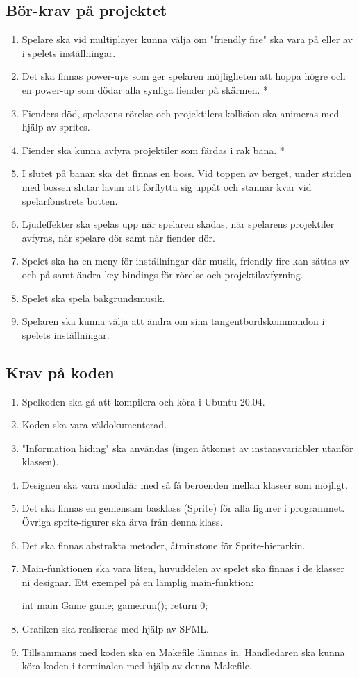 \documentclass{TDP005mall}
\begin{document}
\subsection{Bör-krav på projektet}
\begin{enumerate}
\item Spelare ska vid multiplayer kunna välja om "friendly fire" ska vara på eller av i spelets inställningar. 
\item Det ska finnas power-ups som ger spelaren möjligheten att hoppa högre och en power-up som dödar alla synliga fiender på skärmen. *
\item Fienders död, spelarens rörelse och projektilers kollision ska animeras med hjälp av sprites.
\item Fiender ska kunna avfyra projektiler som färdas i rak bana. *
\item I slutet på banan ska det finnas en boss. Vid toppen av berget, under striden med bossen slutar lavan att förflytta sig uppåt och stannar kvar vid spelarfönstrets botten.
\item Ljudeffekter ska spelas upp när spelaren skadas, när spelarens projektiler avfyras, när spelare dör samt när fiender dör.
\item Spelet ska ha en meny för inställningar där musik, friendly-fire kan sättas av och på samt ändra key-bindings för rörelse och projektilavfyrning.
\item Spelet ska spela bakgrundsmusik.
\item Spelaren ska kunna välja att ändra om sina tangentbordskommandon i spelets inställningar.
\end{enumerate}

\subsection{Krav på koden}
\begin{enumerate}
\item    Spelkoden ska gå att kompilera och köra i Ubuntu 20.04.
\item    Koden ska vara väldokumenterad.
\item    "Information hiding" ska användas (ingen åtkomst av instansvariabler utanför klassen).
\item    Designen ska vara modulär med så få beroenden mellan klasser som möjligt.
\item    Det ska finnas en gemensam basklass (Sprite) för alla figurer i programmet. Övriga sprite-figurer ska ärva från denna klass.
\item    Det ska finnas abstrakta metoder, åtminstone för Sprite-hierarkin.
\item    Main-funktionen ska vara liten, huvuddelen av spelet ska finnas i de klasser ni designar. Ett exempel på en lämplig main-funktion:

    int main {
       Game game;
       game.run();
       return 0;
    }
        

\item    Grafiken ska realiseras med hjälp av SFML.
\item    Tillsammans med koden ska en Makefile lämnas in. Handledaren ska kunna köra koden i terminalen med hjälp av denna Makefile.
\end{enumerate}
\end{document}
